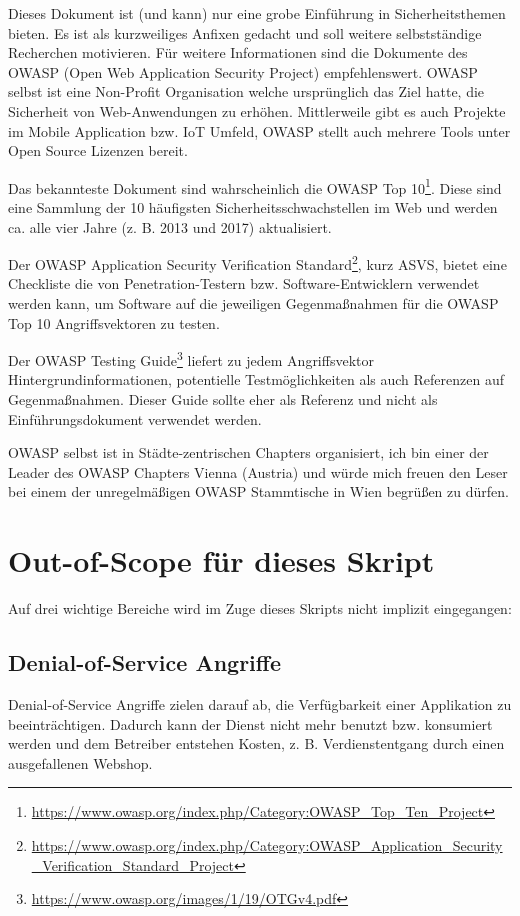 Dieses Dokument ist (und kann) nur eine grobe Einführung in Sicherheitsthemen bieten. Es ist als kurzweiliges Anfixen gedacht und soll weitere selbstständige Recherchen motivieren. Für weitere Informationen sind die Dokumente des OWASP (Open Web Application Security Project) empfehlenswert. OWASP selbst ist eine Non-Profit Organisation welche ursprünglich das Ziel hatte, die Sicherheit von Web-Anwendungen zu erhöhen. Mittlerweile gibt es auch Projekte im Mobile Application bzw. IoT Umfeld, OWASP stellt auch mehrere Tools unter Open Source Lizenzen bereit.

Das bekannteste Dokument sind wahrscheinlich die OWASP Top 10\footnote{\url{https://www.owasp.org/index.php/Category:OWASP_Top_Ten_Project}}. Diese sind eine Sammlung der 10 häufigsten Sicherheitsschwachstellen im Web und werden ca. alle vier Jahre (z. B. 2013 und 2017) aktualisiert.

Der OWASP Application Security Verification Standard\footnote{\url{https://www.owasp.org/index.php/Category:OWASP_Application_Security_Verification_Standard_Project}}, kurz ASVS, bietet eine Checkliste die von Penetration-Testern bzw. Software-Entwicklern verwendet werden kann, um Software auf die jeweiligen Gegenmaßnahmen für die OWASP Top 10 Angriffsvektoren zu testen.

Der OWASP Testing Guide\footnote{\url{https://www.owasp.org/images/1/19/OTGv4.pdf}} liefert zu jedem Angriffsvektor Hintergrundinformationen, potentielle Testmöglichkeiten als auch Referenzen auf Gegenmaßnahmen. Dieser Guide sollte eher als Referenz und nicht als Einführungsdokument verwendet werden.

OWASP selbst ist in Städte-zentrischen Chapters organisiert, ich bin einer der Leader des OWASP Chapters Vienna (Austria) und würde mich freuen den Leser bei einem der unregelmäßigen OWASP Stammtische in Wien begrüßen zu dürfen.

\section{Out-of-Scope für dieses Skript}

Auf drei wichtige Bereiche wird im Zuge dieses Skripts nicht implizit eingegangen:

\subsection{Denial-of-Service Angriffe}

Denial-of-Service Angriffe zielen darauf ab, die Verfügbarkeit einer Applikation zu beeinträchtigen. Dadurch kann der Dienst nicht mehr benutzt bzw. konsumiert werden und dem Betreiber entstehen Kosten, z. B. Verdienstentgang durch einen ausgefallenen Webshop.

